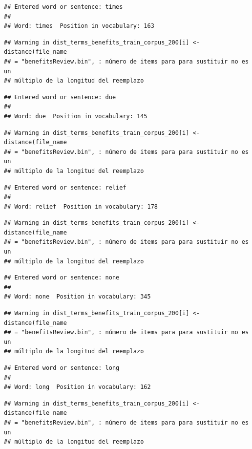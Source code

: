 \documentclass[spanish,]{article}
\begin{document}
\begin{verbatim}
## Entered word or sentence: times
## 
## Word: times  Position in vocabulary: 163
\end{verbatim}

\begin{verbatim}
## Warning in dist_terms_benefits_train_corpus_200[i] <- distance(file_name
## = "benefitsReview.bin", : número de items para para sustituir no es un
## múltiplo de la longitud del reemplazo
\end{verbatim}

\begin{verbatim}
## Entered word or sentence: due
## 
## Word: due  Position in vocabulary: 145
\end{verbatim}

\begin{verbatim}
## Warning in dist_terms_benefits_train_corpus_200[i] <- distance(file_name
## = "benefitsReview.bin", : número de items para para sustituir no es un
## múltiplo de la longitud del reemplazo
\end{verbatim}

\begin{verbatim}
## Entered word or sentence: relief
## 
## Word: relief  Position in vocabulary: 178
\end{verbatim}

\begin{verbatim}
## Warning in dist_terms_benefits_train_corpus_200[i] <- distance(file_name
## = "benefitsReview.bin", : número de items para para sustituir no es un
## múltiplo de la longitud del reemplazo
\end{verbatim}

\begin{verbatim}
## Entered word or sentence: none
## 
## Word: none  Position in vocabulary: 345
\end{verbatim}

\begin{verbatim}
## Warning in dist_terms_benefits_train_corpus_200[i] <- distance(file_name
## = "benefitsReview.bin", : número de items para para sustituir no es un
## múltiplo de la longitud del reemplazo
\end{verbatim}

\begin{verbatim}
## Entered word or sentence: long
## 
## Word: long  Position in vocabulary: 162
\end{verbatim}

\begin{verbatim}
## Warning in dist_terms_benefits_train_corpus_200[i] <- distance(file_name
## = "benefitsReview.bin", : número de items para para sustituir no es un
## múltiplo de la longitud del reemplazo
\end{verbatim}
\end{document}
